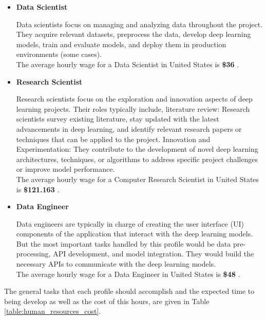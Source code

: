 \begin{itemize}
  \item \textbf{Data Scientist}

    Data scientists focus on managing and analyzing data throughout the
    project. They acquire relevant datasets, preprocess the data, develop deep
    learning models, train and evaluate models, and deploy them in production
    environments (some cases). \\

    The average hourly wage for a Data Scientist in United States is
    \textbf{\$36} \cite{SalaryDataScientist}. \\

  \item \textbf{Research Scientist}

    Research scientists focus on the exploration and innovation aspects of deep
    learning projects. Their roles typically include, literature review:
    Research scientists survey existing literature, stay updated with the
    latest advancements in deep learning, and identify relevant research papers
    or techniques that can be applied to the project. Innovation and
    Experimentation: They contribute to the development of novel deep learning
    architectures, techniques, or algorithms to address specific project
    challenges or improve model performance. \\

    The average hourly wage for a Computer Research Scientist in United States
    is \textbf{\$121.163} \cite{SalaryResearchScientist}. \\

  \item \textbf{Data Engineer}

    Data engineers are typically in charge of creating the user interface (UI)
    components of the application that interact with the deep learning models.
    But the most important tasks handled by this profile would be data
    pre-processing, API development, and model integration. They would build
    the necessary APIs to communicate with the deep learning models. \\

    The average hourly wage for a Data Engineer in United States is
    \textbf{\$48} \cite{SalaryDataEnginner}. \\

\end{itemize}

The general tasks that each profile should accomplish and the expected time to
being develop as well as the cost of this hours, are given in Table
\ref{table:human_resources_cost}.

